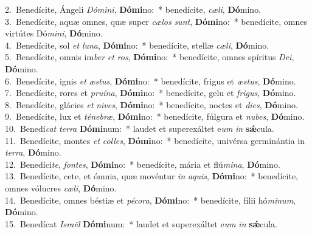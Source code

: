 {2.~}Benedícite, Ángeli \textit{Dó}\textit{mi}\textit{ni}, \textbf{Dó}\textbf{mi}no:~* benedícite, \textit{cæ}\textit{li}, \textbf{Dó}mino.\\
{3.~}Benedícite, aquæ omnes, quæ super \textit{cæ}\textit{los} \textit{sunt}, \textbf{Dó}\textbf{mi}no:~* benedícite, omnes virtútes Dó\textit{mi}\textit{ni}, \textbf{Dó}mino.\\
{4.~}Benedícite, sol \textit{et} \textit{lu}\textit{na}, \textbf{Dó}\textbf{mi}no:~* benedícite, stellæ \textit{cæ}\textit{li}, \textbf{Dó}mino.\\
{5.~}Benedícite, omnis im\textit{ber} \textit{et} \textit{ros}, \textbf{Dó}\textbf{mi}no:~* benedícite, omnes spíritus \textit{De}\textit{i}, \textbf{Dó}mino.\\
{6.~}Benedícite, ignis \textit{et} \textit{æ}\textit{stus}, \textbf{Dó}\textbf{mi}no:~* benedícite, frigus et \textit{æ}\textit{stus}, \textbf{Dó}mino.\\
{7.~}Benedícite, rores et \textit{pru}\textit{í}\textit{na}, \textbf{Dó}\textbf{mi}no:~* benedícite, gelu et \textit{fri}\textit{gus}, \textbf{Dó}mino.\\
{8.~}Benedícite, glácies \textit{et} \textit{ni}\textit{ves}, \textbf{Dó}\textbf{mi}no:~* benedícite, noctes et \textit{di}\textit{es}, \textbf{Dó}mino.\\
{9.~}Benedícite, lux et \textit{té}\textit{ne}\textit{bræ}, \textbf{Dó}\textbf{mi}no:~* benedícite, fúlgura et \textit{nu}\textit{bes}, \textbf{Dó}mino.\\
{10.~}Benedí\textit{cat} \textit{ter}\textit{ra} \textbf{Dó}\textbf{mi}num:~* laudet et superexáltet e\textit{um} \textit{in} \textbf{sǽ}cula.\\
{11.~}Benedícite, montes \textit{et} \textit{col}\textit{les}, \textbf{Dó}\textbf{mi}no:~* benedícite, univérsa germinántia in \textit{ter}\textit{ra}, \textbf{Dó}mino.\\
{12.~}Benedíci\textit{te}, \textit{fon}\textit{tes}, \textbf{Dó}\textbf{mi}no:~* benedícite, mária et flú\textit{mi}\textit{na}, \textbf{Dó}mino.\\
{13.~}Benedícite, cete, et ómnia, quæ movéntur \textit{in} \textit{a}\textit{quis}, \textbf{Dó}\textbf{mi}no:~* benedícite, omnes vólucres \textit{cæ}\textit{li}, \textbf{Dó}mino.\\
{14.~}Benedícite, omnes béstiæ et \textit{pé}\textit{co}\textit{ra}, \textbf{Dó}\textbf{mi}no:~* benedícite, fílii hó\textit{mi}\textit{num}, \textbf{Dó}mino.\\
{15.~}Benedícat \textit{Is}\textit{ra}\textit{ël} \textbf{Dó}\textbf{mi}num:~* laudet et superexáltet e\textit{um} \textit{in} \textbf{sǽ}cula.\\
